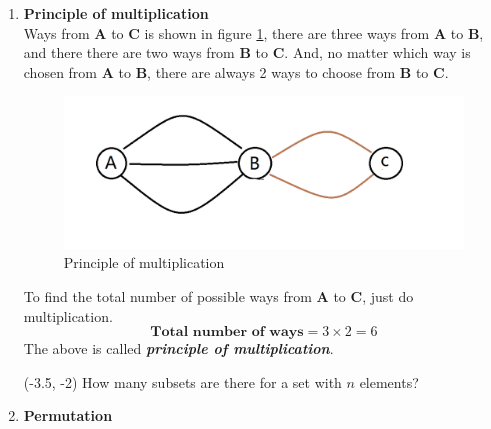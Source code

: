 \documentclass[a4paper, 12pt,twoside]{book}
\begin{document}
    \begin{enumerate}
        \item \textbf{Principle of multiplication}
        \vspace{0.3cm}\\
       Ways from \textbf{A} to \textbf{C} is shown in figure \ref{PrincipleOfMultiplicatioin}, there are three ways from \textbf{A} to \textbf{B}, and there there are two ways from \textbf{B} to \textbf{C}. And, no matter which way is chosen from \textbf{A} to \textbf{B}, there are always 2 ways to choose from \textbf{B} to \textbf{C}. 
       \begin{figure}[H]
           \centering
           \includegraphics[scale=0.6]{PrincipleOfMultiplicatioin}
           \caption{Principle of multiplication}
           \label{PrincipleOfMultiplicatioin}     
       \end{figure}
       
   To find the total number of possible ways from \textbf{A} to \textbf{C}, just do multiplication.
   $$\textbf{Total number of ways} = 3 \times 2 = 6$$
   The above is called \textbf{\textit{principle of multiplication}}.
   
   \begin{textblock}{4}(-3.5, -2)
\noindent
How many subsets are there for a set with $n$ elements?\\
\end{textblock}
\vspace{0.8cm}
   
   \item \textbf{Permutation}
   \vspace{0.3cm}
   

\end{enumerate}
\end{document}
